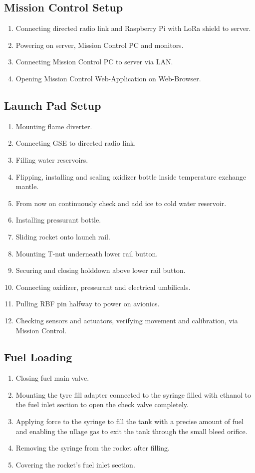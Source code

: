 \subsection{Mission Control Setup}
\begin{enumerate}
\item Connecting directed radio link and Raspberry Pi with LoRa shield to server.
\item Powering on server, Mission Control PC and monitors.
\item Connecting Mission Control PC to server via LAN.
\item Opening Mission Control Web-Application on Web-Browser.
\end{enumerate}

\subsection{Launch Pad Setup}
\begin{enumerate}
\item Mounting flame diverter.
\item Connecting GSE to directed radio link.
\item Filling water reservoirs.
\item Flipping, installing and sealing oxidizer bottle inside temperature exchange mantle.
\item From now on continuously check and add ice to cold water reservoir.
\item Installing pressurant bottle.
\item Sliding rocket onto launch rail.
\item Mounting T-nut underneath lower rail button.
\item Securing and closing holddown above lower rail button.
\item Connecting oxidizer, pressurant and electrical umbilicals.
\item Pulling RBF pin halfway to power on avionics.
\item Checking sensors and actuators, verifying movement and calibration, via Mission Control.
\end{enumerate}

\subsection{Fuel Loading} \label{Fuel Loading}
\begin{enumerate}
\item Closing fuel main valve.
\item Mounting the tyre fill adapter connected to the syringe filled with ethanol to the fuel inlet section to open the check valve completely.
\item Applying force to the syringe to fill the tank with a precise amount of fuel and enabling the ullage gas to exit the tank through the small bleed orifice.
\item Removing the syringe from the rocket after filling.
\item Covering the rocket’s fuel inlet section.
\end{enumerate}

